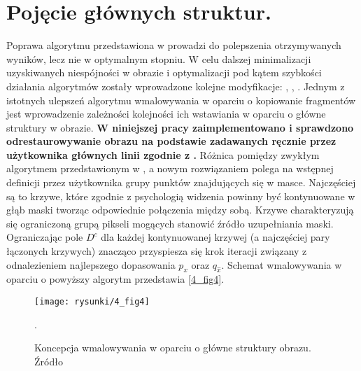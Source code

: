 \documentclass[12pt, twoside, openany]{report}
\theoremstyle{definition}
\begin{document}
\section{Pojęcie głównych struktur.}
Poprawa algorytmu przedstawiona w \cite{criminisi2004region} prowadzi do polepszenia otrzymywanych wyników, lecz nie w optymalnym stopniu. W celu dalszej minimalizacji uzyskiwanych niespójności w obrazie i optymalizacji pod kątem szybkości działania algorytmów zostały wprowadzone kolejne modyfikacje: \cite{StructurePropagationManual},  \cite{malluvalasaimplementation}, \cite{SalientStrucTexProp}. 
Jednym z istotnych ulepszeń algorytmu wmalowywania w oparciu o kopiowanie fragmentów jest wprowadzenie zależności kolejności ich wstawiania w oparciu o główne struktury w obrazie.
\textbf{W niniejszej pracy zaimplementowano i sprawdzono odrestaurowywanie obrazu na podstawie zadawanych ręcznie przez użytkownika głównych linii zgodnie z \cite{StructurePropagationManual}.}
Różnica pomiędzy zwykłym algorytmem przedstawionym w \cite{criminisi2004region}, a nowym rozwiązaniem polega na wstępnej definicji przez użytkownika grupy punktów znajdujących się w masce. Najczęściej są to krzywe, które zgodnie z psychologią widzenia powinny być kontynuowane w głąb maski tworząc odpowiednie połączenia między sobą. Krzywe charakteryzują się ograniczoną grupą pikseli mogących stanowić źródło uzupełniania maski. Ograniczając pole $D^c$ dla każdej kontynuowanej krzywej (a najczęściej pary łączonych krzywych) znacząco przyspiesza się krok iteracji związany z odnalezieniem najlepszego dopasowania $p_x$ oraz $q_{\hat{x}}$. Schemat wmalowywania w oparciu o powyższy algorytm przedstawia \autoref{4_fig4}.
\begin{figure}[!h]
	\centering
	\texttt{[image: rysunki/4\_fig4]}
	\caption{Koncepcja wmalowywania w oparciu o główne struktury obrazu. Źródło \cite{StructurePropagationManual}}.
	\label{4_fig4} 
\end{figure}
\end{document}
